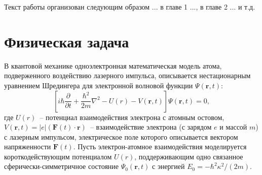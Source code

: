 \documentclass[14pt]{extarticle}
\newcommand{\sectionbreak}{\clearpage}
\newcommand{\vF}{\mathbf{F}}
\newcommand{\vr}{\mathbf{r}}
\begin{document}
Текст работы организован следующим образом ... в главе 1 ..., в главе 2 ... и т.д.
\sectionbreak


\section{Физическая задача}

В квантовой механике одноэлектронная математическая модель атома, подверженного воздействию
лазерного импульса, описывается нестационарным уравнением Шредингера для электронной волновой функции $\Psi(\vr,t)$:
\begin{equation}
\label{TDSE}
\left[i\hbar\frac{\partial}{\partial t} + \frac{\hbar^2}{2m}\nabla^2 - U(r) - V(\vr,t)\right]\Psi(\vr,t) = 0,
\end{equation}
где $U(r)$~-- потенциал взаимодействия электрона с атомным остовом, $V(\vr,t)=|e|(\vF(t)\cdot\vr)$~-- взаимодействие электрона (с зарядом $e$ и массой $m$) с лазерным импульсом, электрическое поле которого описывается вектором напряженности $\vF(t)$. Пусть электрон-атомное взаимодействия моделируется короткодействующим потенциалом $U(r)$, поддерживающим одно связанное сферически-симметричное состояние $\Psi_0(\vr,t)$ с энергией $E_0=-\hbar^2\kappa^2/(2m)$. 
\end{document}
